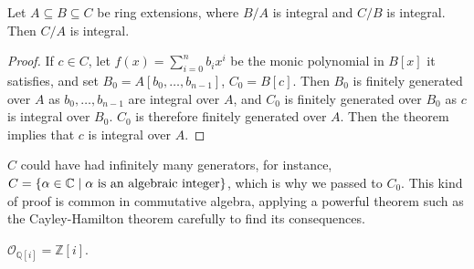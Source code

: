 \begin{corollary}
    Let \( A \subseteq B \subseteq C \) be ring extensions, where \( B / A \) is integral and \( C / B \) is integral.
    Then \( C / A \) is integral.
\end{corollary}
\begin{proof}
    If \( c \in C \), let \( f(x) = \sum_{i=0}^n b_i x^i \) be the monic polynomial in \( B[x] \) it satisfies, and set \( B_0 = A[b_0, \dots, b_{n-1}] \), \( C_0 = B[c] \).
    Then \( B_0 \) is finitely generated over \( A \) as \( b_0, \dots, b_{n-1} \) are integral over \( A \), and \( C_0 \) is finitely generated over \( B_0 \) as \( c \) is integral over \( B_0 \).
    \( C_0 \) is therefore finitely generated over \( A \).
    Then the theorem implies that \( c \) is integral over \( A \).
\end{proof}
\begin{remark}
    \( C \) could have had infinitely many generators, for instance, \( C = \qty{\alpha \in \mathbb C \mid \alpha \text{ is an algebraic integer}} \), which is why we passed to \( C_0 \).
    This kind of proof is common in commutative algebra, applying a powerful theorem such as the Cayley-Hamilton theorem carefully to find its consequences.
\end{remark}
\begin{example}
    \( \mathcal O_{\mathbb Q[i]} = \mathbb Z[i] \).
\end{example}

